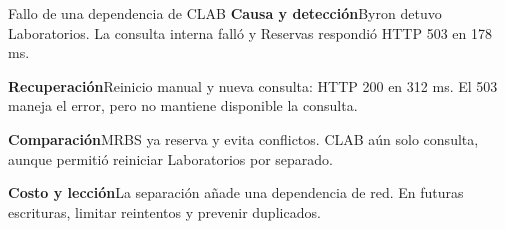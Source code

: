 \begin{frame}{Fallo de una dependencia de CLAB}\relax
\small
\textbf{Causa y detección}\quad Byron detuvo Laboratorios. La consulta interna falló y Reservas respondió HTTP 503 en 178 ms. \cite{clabEsqueleto2026}\par\smallskip
\textbf{Recuperación}\quad Reinicio manual y nueva consulta: HTTP 200 en 312 ms. El 503 maneja el error, pero no mantiene disponible la consulta.\par\smallskip
\textbf{Comparación}\quad MRBS ya reserva y evita conflictos. CLAB aún solo consulta, aunque permitió reiniciar Laboratorios por separado. \cite{mrbs2026}\par\smallskip
\textbf{Costo y lección}\quad La separación añade una dependencia de red. En futuras escrituras, limitar reintentos y prevenir duplicados. \cite{azureRetry2026}
\end{frame}
